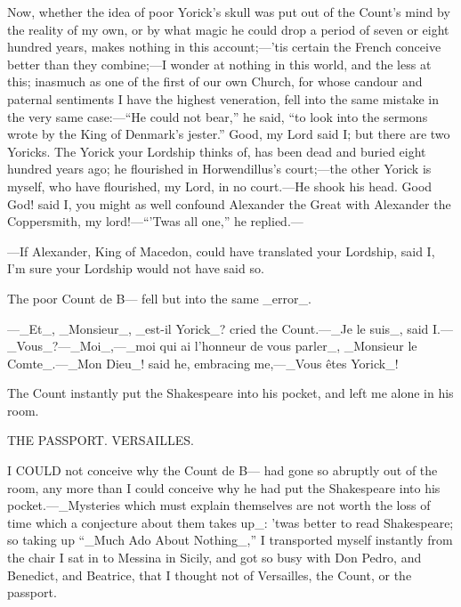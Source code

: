 \documentclass[twoside]{article}
\begin{document}
Now, whether the idea of poor Yorick’s skull was put out of the Count’s
mind by the reality of my own, or by what magic he could drop a period of
seven or eight hundred years, makes nothing in this account;—’tis certain
the French conceive better than they combine;—I wonder at nothing in this
world, and the less at this; inasmuch as one of the first of our own
Church, for whose candour and paternal sentiments I have the highest
veneration, fell into the same mistake in the very same case:—“He could
not bear,” he said, “to look into the sermons wrote by the King of
Denmark’s jester.”  Good, my Lord said I; but there are two Yoricks.  The
Yorick your Lordship thinks of, has been dead and buried eight hundred
years ago; he flourished in Horwendillus’s court;—the other Yorick is
myself, who have flourished, my Lord, in no court.—He shook his head.
Good God! said I, you might as well confound Alexander the Great with
Alexander the Coppersmith, my lord!—“’Twas all one,” he replied.—

—If Alexander, King of Macedon, could have translated your Lordship, said
I, I’m sure your Lordship would not have said so.

The poor Count de B— fell but into the same _error_.

—_Et_, _Monsieur_, _est-il Yorick_? cried the Count.—_Je le suis_, said
I.—_Vous_?—_Moi_,—_moi qui ai l’honneur de vous parler_, _Monsieur le
Comte_.—_Mon Dieu_! said he, embracing me,—_Vous êtes Yorick_!

The Count instantly put the Shakespeare into his pocket, and left me
alone in his room.




THE PASSPORT.
VERSAILLES.


I COULD not conceive why the Count de B— had gone so abruptly out of the
room, any more than I could conceive why he had put the Shakespeare into
his pocket.—_Mysteries which must explain themselves are not worth the
loss of time which a conjecture about them takes up_: ’twas better to
read Shakespeare; so taking up “_Much Ado About Nothing_,” I transported
myself instantly from the chair I sat in to Messina in Sicily, and got so
busy with Don Pedro, and Benedict, and Beatrice, that I thought not of
Versailles, the Count, or the passport.
\end{document}
